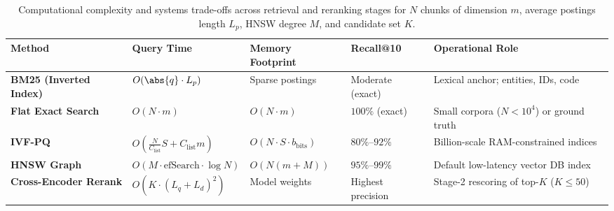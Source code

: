 \documentclass[../../../../master.tex]{subfiles}
\begin{document}
\begin{table}[htbp]
\caption{Computational complexity and systems trade-offs across retrieval and reranking stages for $N$ chunks of dimension $m$, average postings length $L_p$, HNSW degree $M$, and candidate set $K$.}
\label{tab:rag:complexity}
\centering\footnotesize\setlength{\tabcolsep}{4.5pt}
\begin{tabularx}{\textwidth}{@{}>{\bfseries}l l l l >{\raggedright\arraybackslash}X@{}}
\toprule
Method & Query Time & Memory Footprint & Recall@10 & Operational Role \\
\midrule
BM25 (Inverted Index) & $O(\abs{q} \cdot L_p)$ & Sparse postings & Moderate (exact) & Lexical anchor; entities, IDs, code \\
Flat Exact Search & $O(N \cdot m)$ & $O(N \cdot m)$ & $100\%$ (exact) & Small corpora ($N < 10^4$) or ground truth \\
IVF-PQ & $O(\frac{N}{C_{\mathrm{list}}} S + C_{\mathrm{list}} m)$ & $O(N \cdot S \cdot b_{\mathrm{bits}})$ & $80\%$--$92\%$ & Billion-scale RAM-constrained indices \\
HNSW Graph & $O(M \cdot \mathrm{efSearch} \cdot \log N)$ & $O(N(m + M))$ & $95\%$--$99\%$ & Default low-latency vector DB index \\
Cross-Encoder Rerank & $O(K \cdot (L_q + L_d)^2)$ & Model weights & Highest precision & Stage-2 rescoring of top-$K$ ($K \le 50$) \\
\bottomrule
\end{tabularx}
\end{table}
\end{document}
